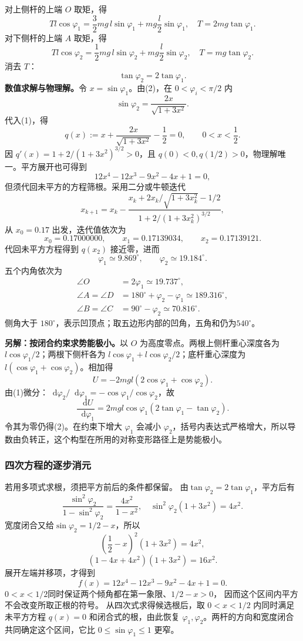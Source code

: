 \documentclass[UTF8,fontset=fandol,a4paper,11pt]{ctexart}
\newcommand{\dd}{\mathop{}\!\mathrm{d}}
\begin{document}
对上侧杆的上端 $O$ 取矩，得
\[
 Tl\cos\varphi_1
 =\frac32mg\,l\sin\varphi_1
  +mg\frac l2\sin\varphi_1,
 \quad T=2mg\tan\varphi_1.
\]
对下侧杆的上端 $A$ 取矩，得
\[
 Tl\cos\varphi_2
 =\frac12mg\,l\sin\varphi_2
  +mg\frac l2\sin\varphi_2,
 \quad T=mg\tan\varphi_2.
\]
消去 $T$：
\[
 \tan\varphi_2=2\tan\varphi_1.\tag{2}
\]
\textbf{数值求解与物理解。}令 $x=\sin\varphi_1$。由(2)，在 $0<\varphi_i<\pi/2$ 内
\[
 \sin\varphi_2=\frac{2x}{\sqrt{1+3x^2}}.
\]
代入(1)，得
\[
 q(x):=x+\frac{2x}{\sqrt{1+3x^2}}-\frac12=0,
 \qquad 0<x<\frac12.
\]
因 $q'(x)=1+2/(1+3x^2)^{3/2}>0$，且 $q(0)<0,q(1/2)>0$，物理解唯一。平方展开也可得到
\[
 12x^4-12x^3-9x^2-4x+1=0,
\]
但须代回未平方的方程筛根。采用二分或牛顿迭代
\[
 x_{k+1}=x_k-
 \frac{x_k+2x_k/\sqrt{1+3x_k^2}-1/2}
 {1+2/(1+3x_k^2)^{3/2}},
\]
从 $x_0=0.17$ 出发，迭代值依次为
\[
 x_0=0.17000000,\qquad x_1=0.17139034,\qquad x_2=0.17139121.
\]
代回未平方方程得到 $q(x_2)$ 接近零，进而
\[
 \varphi_1\simeq9.869^\circ,\qquad
 \varphi_2\simeq19.184^\circ.
\]
五个内角依次为
\[
 \boxed{\begin{aligned}
 \angle O&=2\varphi_1\simeq19.737^\circ,\\
 \angle A=\angle D&=180^\circ+\varphi_2-\varphi_1
 \simeq189.316^\circ,\\
 \angle B=\angle C&=90^\circ-\varphi_2\simeq70.816^\circ.
 \end{aligned}}
\]
侧角大于 $180^\circ$，表示凹顶点；取五边形内部的凹角，五角和仍为$540^\circ$。

\textbf{另解：按闭合约束求势能极小。}以 $O$ 为高度零点。两根上侧杆重心深度各为 $l\cos\varphi_1/2$；两根下侧杆各为 $l\cos\varphi_1+l\cos\varphi_2/2$；底杆重心深度为 $l(\cos\varphi_1+\cos\varphi_2)$。相加得
\[
 U=-2mgl(2\cos\varphi_1+\cos\varphi_2).
\]
由(1)微分：$\dd\varphi_2/\dd\varphi_1=-\cos\varphi_1/\cos\varphi_2$，故
\[
 \frac{\dd U}{\dd\varphi_1}
 =2mgl\cos\varphi_1(2\tan\varphi_1-\tan\varphi_2).
\]
令其为零仍得(2)。在约束下增大 $\varphi_1$ 会减小 $\varphi_2$，括号内表达式严格增大，所以导数由负转正，这个构型在所用的对称变形路径上是势能极小。
\subsubsection*{四次方程的逐步消元}
若用多项式求根，须把平方前后的条件都保留。
由$\tan\varphi_2=2\tan\varphi_1$，平方后有
\[
\frac{\sin^2\varphi_2}{1-\sin^2\varphi_2}
=\frac{4x^2}{1-x^2},
\quad
\sin^2\varphi_2(1+3x^2)=4x^2.
\]
宽度闭合又给$\sin\varphi_2=1/2-x$，所以
\[
\left(\frac12-x\right)^2(1+3x^2)=4x^2,
\]
\[
(1-4x+4x^2)(1+3x^2)=16x^2.
\]
展开左端并移项，才得到
\[
f(x)=12x^4-12x^3-9x^2-4x+1=0.
\]
$0<x<1/2$同时保证两个倾角都在第一象限、$1/2-x>0$，
因而这个区间内平方不会改变所取正根的符号。
从四次式求得候选根后，取 $0<x<1/2$ 内同时满足未平方方程 $q(x)=0$ 和闭合式的根，由此恢复 $\varphi_1,\varphi_2$。两杆的方向和宽度闭合共同确定这个区间，它比 $0\leq\sin\varphi_1\leq1$ 更窄。
\end{document}
